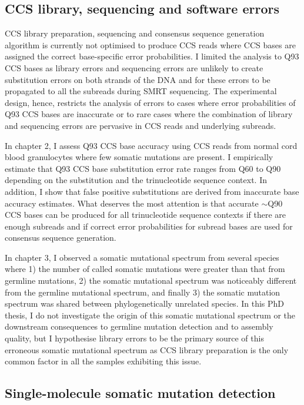 \subsection{CCS library, sequencing and software errors}

CCS library preparation, sequencing and consensus sequence generation algorithm is currently not optimised to produce CCS reads where CCS bases are assigned the correct base-specific error probabilities. I limited the analysis to Q93 CCS bases as library errors and sequencing errors are unlikely to create substitution errors on both strands of the DNA and for these errors to be propagated to all the subreads during SMRT sequencing. The experimental design, hence, restricts the analysis of errors to cases where error probabilities of Q93 CCS bases are inaccurate or to rare cases where the combination of library and sequencing errors are pervasive in CCS reads and underlying subreads.

In chapter 2, I assess Q93 CCS base accuracy using CCS reads from normal cord blood granulocytes where few somatic mutations are present. I empirically estimate that Q93 CCS base substitution error rate ranges from Q60 to Q90 depending on the substitution and the trinucleotide sequence context. In addition, I show that false positive substitutions are derived from inaccurate base accuracy estimates. What deserves the most attention is that accurate $\sim$Q90 CCS bases can be produced for all trinucleotide sequence contexts if there are enough subreads and if correct error probabilities for subread bases are used for consensus sequence generation. 

In chapter 3, I observed a somatic mutational spectrum from several species where 1) the number of called somatic mutations were greater than that from germline mutations, 2) the somatic mutational spectrum was noticeably different from the germline mutational spectrum, and finally 3) the somatic mutation spectrum was shared between phylogenetically unrelated species. In this PhD thesis, I do not investigate the origin of this somatic mutational spectrum or the downstream consequences to germline mutation detection and to assembly quality, but I hypothesise library errors to be the primary source of this erroneous somatic mutational spectrum as CCS library preparation is the only common factor in all the samples exhibiting this issue. 

\subsection{Single-molecule somatic mutation detection}

